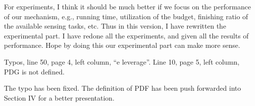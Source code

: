 \documentclass[a4paper,11pt]{exam}
\begin{document}
\begin{questions}
\begin{solution}
For experiments, I think it should be much better if we focus on the performance of our mechanism, e.g., running time, utilization of the budget, finishing ratio of the available sensing tasks, etc. Thus in this version, I have rewritten the experimental part. I have redone all the experiments, and given all the results of performance. Hope by doing this our experimental part can make more sense. 
\end{solution}

\question Typos, line 50, page 4, left column, “e leverage”. Line 10, page 5, left column, PDG is not defined.
\begin{solution}
The typo has been fixed. 
The definition of PDF has been push forwarded into Section IV for a better presentation.
\end{solution}
\end{questions}
\end{document}
